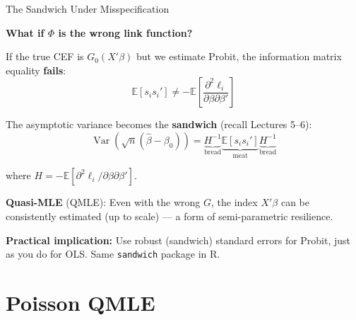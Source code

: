 \documentclass[aspectratio=169]{beamer}
\numberwithin{equation}{section}
\begin{document}

\begin{frame}{The Sandwich Under Misspecification}

\textbf{What if $\Phi$ is the wrong link function?}

\pause

If the true CEF is $G_0(X'\beta)$ but we estimate Probit, the information matrix equality \textbf{fails}:
\[
\mathbb{E}[s_i s_i'] \neq -\mathbb{E}\!\left[\frac{\partial^2 \ell_i}{\partial \beta \partial \beta'}\right]
\]

\pause

The asymptotic variance becomes the \textbf{sandwich} (recall Lectures 5--6):
\[
\operatorname{Var}(\sqrt{n}(\hat\beta - \beta_0))
=
\underbrace{H^{-1}}_{\text{bread}}
\underbrace{\mathbb{E}[s_i s_i']}_{\text{meat}}
\underbrace{H^{-1}}_{\text{bread}}
\]

where $H = -\mathbb{E}[\partial^2 \ell_i / \partial\beta\partial\beta']$.

\pause

\textbf{Quasi-MLE} (QMLE): Even with the wrong $G$, the index $X'\beta$ can be consistently estimated (up to scale) --- a form of semi-parametric resilience.

\pause

\textbf{Practical implication:} Use robust (sandwich) standard errors for Probit, just as you do for OLS. Same \texttt{sandwich} package in R.

\end{frame}

\section{Poisson QMLE}
\end{document}
